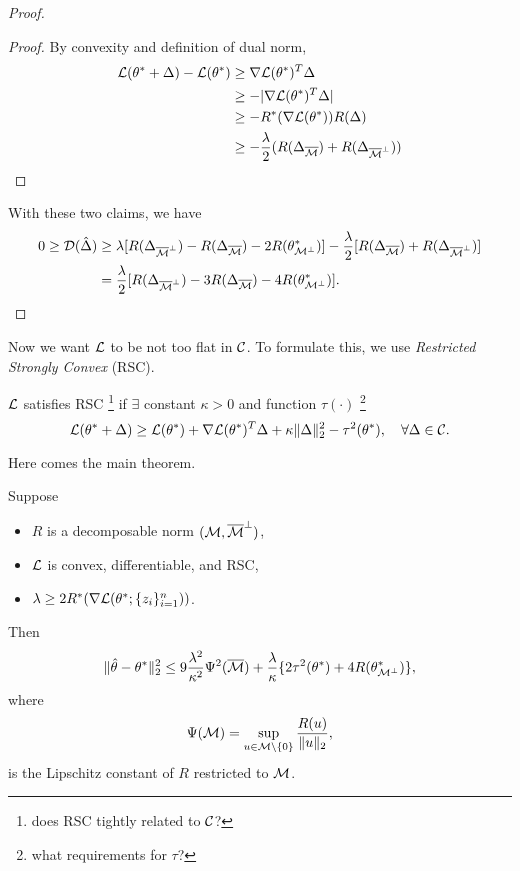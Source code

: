 \begin{proof}
    \begin{proof}
        By convexity and definition of dual norm,
        \begin{align}
            \mathcal{L}(\theta^*+\Delta)-\mathcal{L}(\theta^*) & \ge \nabla\mathcal{L}(\theta^*)^T\Delta \\
                & \ge-|\nabla\mathcal{L}(\theta^*)^T\Delta| \\
                & \ge -R^*(\nabla\mathcal{L}(\theta^*))R(\Delta)    \\
                & \ge -\frac{\lambda}{2}(R(\Delta_{{\overline{\mathcal{M}}}})+R(\Delta_{{\overline{\mathcal{M}}}^\perp}))
        \end{align}
    \end{proof}

    With these two claims, we have
    \begin{equation}
    \begin{split}
    0 \ge \mathcal{D}({\hat\Delta}) & \ge \lambda[R(\Delta_{{\overline{\mathcal{M}}}^\perp})-R(\Delta_{{\overline{\mathcal{M}}}})-2R(\theta^*_{\mathcal{M}^\perp})]
        -\frac{\lambda}{2}[R(\Delta_{{\overline{\mathcal{M}}}})+R(\Delta_{{\overline{\mathcal{M}}}^\perp})]  \\
    & = \frac{\lambda}{2}[R(\Delta_{{\overline{\mathcal{M}}}^\perp})-3R(\Delta_{{\overline{\mathcal{M}}}})-4R(\theta^*_{\mathcal{M}^\perp})].
    \end{split}
    \end{equation}
\end{proof}

Now we want $\mathcal{L}$ to be not too flat in $\mathcal{C}$.
To formulate this, we use \emph{Restricted Strongly Convex} (RSC).

\begin{define}
    $\mathcal{L}$ satisfies RSC
    \footnote{does RSC tightly related to $\mathcal{C}$?}
    if $\exists$ constant $\kappa > 0$ and function $\tau(\cdot)$
    \footnote{what requirements for $\tau$?}
    \st
    \begin{equation}
        \mathcal{L}(\theta^*+\Delta)\ge \mathcal{L}(\theta^*) + \nabla \mathcal{L}(\theta^*)^T\Delta + \kappa\|\Delta\|_2^2-\tau^2(\theta^*),\quad \forall \Delta\in\mathcal{C}.
    \end{equation}
\end{define}

Here comes the main theorem.

\begin{thm}
Suppose
\begin{itemize}
    \item $R$ is a decomposable norm \wrt $(\mathcal{M}, {\overline{\mathcal{M}}}^\perp)$,
    \item $\mathcal{L}$ is convex, differentiable, and RSC,
    \item $\lambda\ge 2R^*(\nabla\mathcal{L}(\theta^*;\{z_i\}_{i=1}^n))$.
\end{itemize}
Then
\begin{equation}
    \|{\hat{\theta}}-\theta^*\|_2^2\le 9\frac{\lambda^2}{\kappa^2}\Psi^2({\overline{\mathcal{M}}})
        + \frac{\lambda}{\kappa}\{2\tau^2(\theta^*)+4R(\theta^*_{\mathcal{M}^\perp})\},
\end{equation}
where
\begin{equation}
    \Psi(\mathcal{M})=\sup_{u\in\mathcal{M}\backslash\{0\}}\frac{R(u)}{\|u\|_2},
\end{equation}
is the Lipschitz constant of $R$ restricted to $\mathcal{M}$.
\end{thm}

